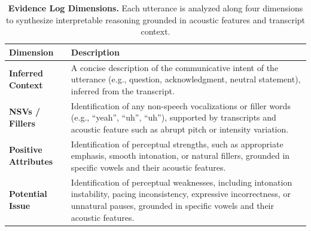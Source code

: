 \begin{table}[!t]
\centering
\renewcommand{\arraystretch}{1.25}
\setlength{\tabcolsep}{10pt}
\captionsetup{font=small}
\footnotesize
\caption{\textbf{Evidence Log Dimensions.}
Each utterance is analyzed along four dimensions to synthesize interpretable reasoning grounded in acoustic features and transcript context.}
\vspace{-0.6em}

\begin{tabular}{p{2.4cm} p{12.6cm}}
\toprule
\textbf{Dimension} & \textbf{Description} \\
\midrule
\textbf{Inferred Context} &
A concise description of the communicative intent of the utterance (e.g., question, acknowledgment, neutral statement), inferred from the transcript. \\

\textbf{NSVs / Fillers} &
Identification of any non-speech vocalizations or filler words (e.g., ``yeah'', ``uh'',  ``uh''), supported by transcripts and acoustic feature such as abrupt pitch or intensity variation. \\

\textbf{Positive Attributes} &
Identification of perceptual strengths, such as appropriate emphasis, smooth intonation, or natural fillers, grounded in specific vowels and their acoustic features. \\

\textbf{Potential Issue} &
Identification of perceptual weaknesses, including intonation instability, pacing inconsistency, expressive incorrectness, or unnatural pauses, grounded in specific vowels and their acoustic features.  \\

\bottomrule
\end{tabular}
\label{table:cot-dimensions}
\vspace{-1em}
\end{table}
